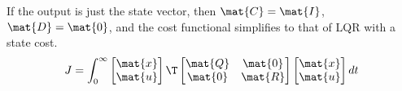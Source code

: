 If the output is just the state vector, then $\mat{C} = \mat{I}$,
$\mat{D} = \mat{0}$, and the cost functional simplifies to that of LQR with a
state cost.
\begin{equation*}
  J = \int_0^\infty
  \begin{bmatrix}
    \mat{x} \\
    \mat{u}
  \end{bmatrix}\T
  \begin{bmatrix}
    \mat{Q} & \mat{0} \\
    \mat{0} & \mat{R}
  \end{bmatrix}
  \begin{bmatrix}
    \mat{x} \\
    \mat{u}
  \end{bmatrix}
  dt
\end{equation*}
